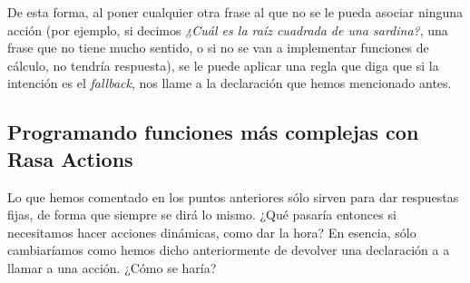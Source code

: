 De esta forma, al poner cualquier otra frase al que no se le pueda asociar ninguna acción (por ejemplo, si decimos \textit{¿Cuál es la raíz cuadrada de una sardina?}, una frase que no tiene mucho sentido, o si no se van a implementar funciones de cálculo, no tendría respuesta), se le puede aplicar una regla que diga que si la intención es el \textit{fallback}, nos llame a la declaración que hemos mencionado antes.

\subsection{Programando funciones más complejas con Rasa Actions}
Lo que hemos comentado en los puntos anteriores sólo sirven para dar respuestas fijas, de forma que siempre se dirá lo mismo. ¿Qué pasaría entonces si necesitamos hacer acciones dinámicas, como dar la hora? En esencia, sólo cambiaríamos como hemos dicho anteriormente de devolver una declaración a a llamar a una acción. ¿Cómo se haría?

